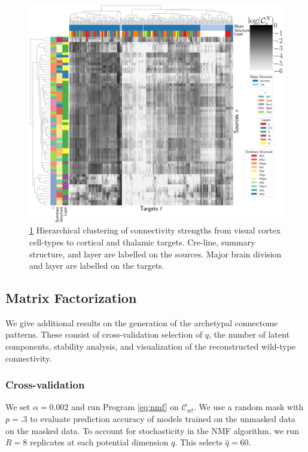 \begin{figure}
 \label{fig:ct_clust}
    \includegraphics[width=.6\textwidth]{figs/heirarchical.png}
\caption{  \ref{fig:ct_clust}
		Hierarchical clustering of connectivity strengths from visual cortex cell-types to cortical and thalamic targets.
		Cre-line, summary structure, and layer are labelled on the sources.
		Major brain division and layer are labelled on the targets.}
  \end{figure}
    
    
\subsection{Matrix Factorization}
\label{supp_sec:matrix_factor_results}

We give additional results on the generation of the archetypal connectome patterns.
These consist of cross-validation selection of $q$, the number of latent components, stability analysis, and visualization of the reconstructed wild-type connectivity.

\subsubsection{Cross-validation}

We set $\alpha = 0.002$ and run Program \ref{eq:nmf} on $\mathcal C_{wt}$.
We use a random mask with $p = .3$ to evaluate prediction accuracy of models trained on the unmasked data on the masked data.
To account for stochasticity in the NMF algorithm, we run $R = 8$ replicates at each potential dimension $q$.
This selects $\hat q = 60$.

